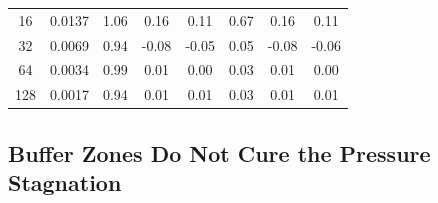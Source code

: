 \documentclass{elsarticle}
\begin{document}
\begin{table}[htbp]
\begin{tabular}{cc | ccc | ccc}
        16                   & 0.0137                      & 1.06                                                   & \phantom{-}0.16                                       & \phantom{-}0.11            & 0.67        & \phantom{-}0.16            & \phantom{-}0.11            \\
        32                   & 0.0069                      & 0.94                                                   & -0.08                                                 & -0.05                      & 0.05        & -0.08                      & -0.06                      \\
        64                   & 0.0034                      & 0.99                                                   & \phantom{-}0.01                                       & \phantom{-}0.00            & 0.03        & \phantom{-}0.01            & \phantom{-}0.00            \\
        128                  & 0.0017                      & 0.94                                                   & \phantom{-}0.01                                       & \phantom{-}0.01            & 0.03        & \phantom{-}0.01            & \phantom{-}0.01            \\
        \bottomrule
    \end{tabular}
\end{table}
\subsection{Buffer Zones Do Not Cure the Pressure Stagnation}
\label{subsec:buffer_configurations}
\end{document}

